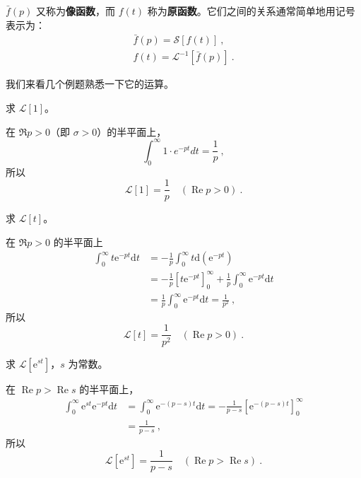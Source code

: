 $\bar f(p)$ 又称为\textbf{像函数}，而 $f(t)$ 称为\textbf{原函数}。它们之间的关系通常简单地用记号表示为：
\begin{equation}
\begin{array}{l}\bar{f}(p)=\mathscr{S}[f(t)] ~,\\ f(t)=\mathscr{L}^{-1}[\bar{f}(p)]~.\end{array}
\end{equation}

我们来看几个例题熟悉一下它的运算。

\begin{example}{}
求 $\mathscr L[1]$。

在 $\Re p>0$（即 $\sigma>0$）的半平面上，
\begin{equation}
\int_{0}^{\infty} 1 \cdot e^{-p t} d t=\frac{1}{p}~,
\end{equation}
所以
\begin{equation}
\mathscr{L}[1]=\frac{1}{p} \quad(\operatorname{Re} p>0)~.
\end{equation}
\end{example}

\begin{example}{}
求 $\mathscr L[t]$。

在 $\Re p>0$ 的半平面上
\begin{equation}
\begin{aligned} \int_{0}^{\infty} t \mathrm{e}^{-p t} \mathrm{d} t &=-\frac{1}{p} \int_{0}^{\infty} t \mathrm{d}\left(\mathrm{e}^{-p t}\right) \\ &=-\frac{1}{p}\left[t \mathrm{e}^{-p t}\right]_{0}^{\infty}+\frac{1}{p} \int_{0}^{\infty} \mathrm{e}^{-p t} \mathrm{d} t \\ &=\frac{1}{p} \int_{0}^{\infty} \mathrm{e}^{-p t} \mathrm{d} t=\frac{1}{p^{2}} ~,\end{aligned}
\end{equation}
所以
\begin{equation}
\mathscr{L}[t]=\frac{1}{p^{2}} \quad(\operatorname{Re} p>0)~.
\end{equation}
\end{example}

\begin{example}{}
求 $\mathscr L[\mathrm e^{st}]$，$s$ 为常数。

在 $\operatorname{Re} p>\operatorname{Re} s$ 的半平面上，
\begin{equation}
\begin{aligned} \int_{0}^{\infty} \mathrm{e}^{s t} \mathrm{e}^{-p t} \mathrm{d} t &=\int_{0}^{\infty} \mathrm{e}^{-(p-s) t} \mathrm{d} t=-\frac{1}{p-s}\left[\mathrm{e}^{-(p-s) t}\right]_{0}^{\infty} \\ &=\frac{1}{p-s}~, \end{aligned}
\end{equation}
所以
\begin{equation}
\mathscr{L}\left[\mathrm{e}^{st}\right]=\frac{1}{p-s} \quad(\operatorname{Re} p>\operatorname{Re} s)~.
\end{equation}
\end{example}

